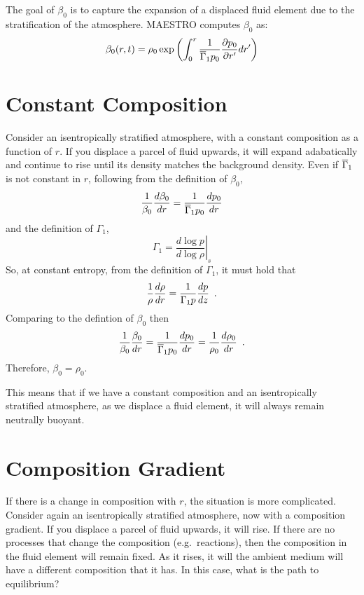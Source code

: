 The goal of $\beta_0$ is to capture the expansion of a displaced fluid
element due to the stratification of the atmosphere.  MAESTRO computes
$\beta_0$ as:
\begin{equation}\label{eq:beta_0}
\beta_0(r,t) = \rho_0 \exp\left (  \int_0^r  \frac{1}{\overline{\Gamma}_1 p_0} \frac{\partial p_0}{\partial r^\prime} dr^\prime \right )
\end{equation}

\section{Constant Composition}
Consider an isentropically stratified atmosphere, with a constant
composition as a function of $r$.  If you displace a parcel of fluid
upwards, it will expand adabatically and continue to rise until its
density matches the background density.  Even if $\overline{\Gamma}_1$ is not
constant in $r$, following from the definition of $\beta_0$,
\begin{equation}
\frac{1}{\beta_0} \frac{d\beta_0}{dr} = \frac{1}{\overline{\Gamma}_1 p_0} \frac{dp_0}{dr}
\end{equation}
and the definition of $\Gamma_1$,
\begin{equation}
\Gamma_1 = \left . \frac{d \log p}{d \log \rho} \right |_s
\end{equation}
So, at constant entropy, from the definition of $\Gamma_1$, it must hold
that
\begin{equation}
\frac{1}{\rho} \frac{d \rho}{dr} = \frac{1}{\Gamma_1 p} \frac{d p}{dz} \enskip .
\end{equation}
Comparing to the defintion of $\beta_0$ then
\begin{equation}
\frac{1}{\beta_0} \frac{\beta_0}{dr} =\frac{1}{\overline{\Gamma}_1 p_0}\frac{dp_0}{dr} = \frac{1}{\rho_0} \frac{d\rho_0}{dr}  \enskip .
\end{equation}
Therefore, $\beta_0 = \rho_0$.  

This means that if we have a constant composition and an
isentropically stratified atmosphere, as we displace a fluid element,
it will always remain neutrally buoyant.



\section{Composition Gradient}

If there is a change in composition with $r$, the situation is more
complicated.  Consider again an isentropically stratified atmosphere,
now with a composition gradient.  If you displace a parcel of fluid
upwards, it will rise.  If there are no processes that change the
composition (e.g.\ reactions), then the composition in the fluid
element will remain fixed.  As it rises, it will the ambient medium
will have a different composition that it has.  In this case, what is
the path to equilibrium?

